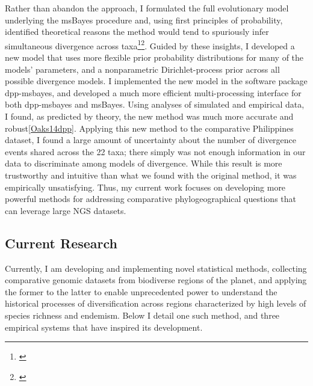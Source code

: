 Rather than abandon the approach, I formulated the full evolutionary model
underlying the msBayes procedure and, using first 
principles of probability, identified theoretical reasons the method
would tend to spuriously infer simultaneous divergence across
taxa\footnote{\label{Oaks12}}\super{,}\footnote{\label{Oaks14reply}}.
Guided by these insights, I developed a new model that uses more flexible prior
probability distributions for many of the models' parameters, and a
nonparametric Dirichlet-process prior across all possible divergence models.
I implemented the new model in the software package dpp-msbayes, and developed
a much more efficient multi-processing interface for both dpp-msbayes and
msBayes.
Using analyses of simulated and empirical data, I found, as predicted by
theory, the new method was much more accurate and robust\cref{Oaks14dpp}.
Applying this new method to the comparative Philippines dataset, I found a
large amount of uncertainty about the number of divergence events shared across
the 22 taxa; there simply was not enough information in our data to
discriminate among models of divergence.
While this result is more trustworthy and intuitive than what we found
with the original method, it was empirically unsatisfying.
Thus, my current work focuses on developing more powerful methods for
addressing comparative phylogeographical questions that can leverage large NGS
datasets.


\subsection*{Current Research}
Currently, I am developing and implementing novel statistical methods,
collecting comparative genomic datasets from biodiverse regions of the planet,
and applying the former to the latter to enable unprecedented power to
understand the historical processes of diversification across regions
characterized by high levels of species richness and endemism.
Below I detail one such method, and three empirical systems that have inspired
its development.

